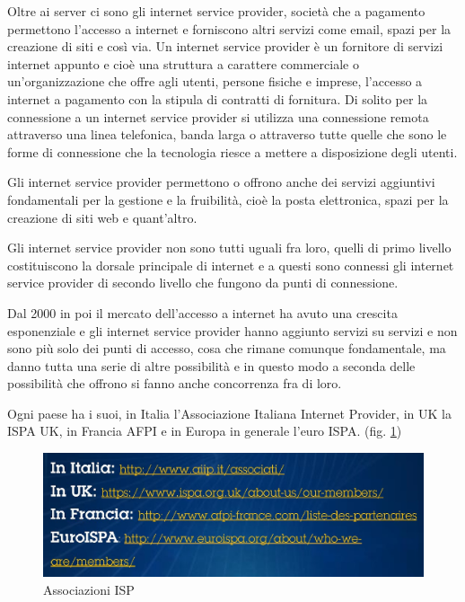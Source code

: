 Oltre ai server ci sono gli internet service provider, società che a pagamento permettono l'accesso a internet e forniscono altri servizi come email, spazi per la creazione di siti e così via. Un internet service provider è un fornitore di servizi internet appunto e cioè una struttura a carattere commerciale o un'organizzazione che offre agli utenti, persone fisiche e imprese, l'accesso a internet a pagamento con la stipula di contratti di fornitura. Di solito per la connessione a un internet service provider si utilizza una connessione remota attraverso una linea telefonica, banda larga o attraverso tutte quelle che sono le forme di connessione che la tecnologia riesce a mettere a disposizione degli utenti.

Gli internet service provider permettono o offrono anche dei servizi aggiuntivi fondamentali per la gestione e la fruibilità, cioè la posta elettronica, spazi per la creazione di siti web e quant'altro.

Gli internet service provider non sono tutti uguali fra loro, quelli di primo livello costituiscono la dorsale principale di internet e a questi sono connessi gli internet service provider di secondo livello che fungono da punti di connessione.

Dal 2000 in poi il mercato dell'accesso a internet ha avuto una crescita esponenziale e gli internet service provider hanno aggiunto servizi su servizi e non sono più solo dei punti di accesso, cosa che rimane comunque fondamentale, ma  danno tutta una serie di altre possibilità e in questo modo a seconda delle possibilità che offrono si fanno anche concorrenza fra di loro.

Ogni paese ha i suoi, in Italia l'Associazione Italiana Internet Provider, in UK la ISPA UK, in Francia AFPI e in Europa in generale l'euro ISPA. (fig. \ref{fig:Associazioni_ISP}) \par

\begin{figure}
    \centering
    \includegraphics[width=1\linewidth]{images/03_lez_fig_04.jpg}
    \caption{Associazioni ISP}
    \label{fig:Associazioni_ISP}
\end{figure}


